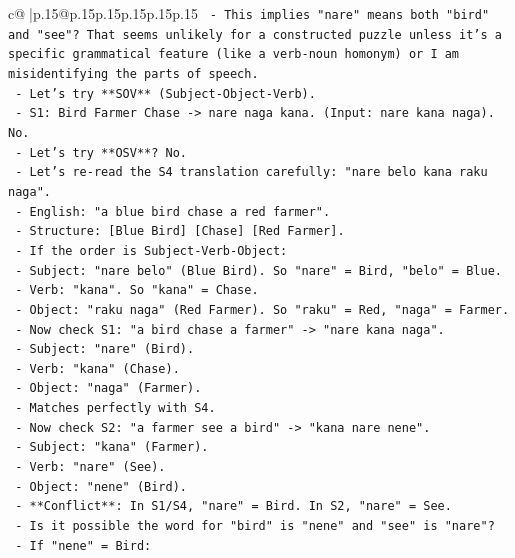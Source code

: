 \documentclass{article}
\begin{document}
{\begin{supertabular}{c@{$\;$}|p{.15\linewidth}@{}p{.15\linewidth}p{.15\linewidth}p{.15\linewidth}p{.15\linewidth}p{.15\linewidth}}
{{{\texttt{           {-} This implies "nare" means both "bird" and "see"? That seems unlikely for a constructed puzzle unless it's a specific grammatical feature (like a verb{-}noun homonym) or I am misidentifying the parts of speech.} \\
\texttt{       {-} Let's try **SOV** (Subject{-}Object{-}Verb).} \\
\texttt{         {-} S1: Bird Farmer Chase {-}> nare naga kana. (Input: nare kana naga). No.} \\
\texttt{       {-} Let's try **OSV**? No.} \\
\texttt{       {-} Let's re{-}read the S4 translation carefully: "nare belo kana raku naga".} \\
\texttt{         {-} English: "a blue bird chase a red farmer".} \\
\texttt{         {-} Structure: {[}Blue Bird{]} {[}Chase{]} {[}Red Farmer{]}.} \\
\texttt{         {-} If the order is Subject{-}Verb{-}Object:} \\
\texttt{           {-} Subject: "nare belo" (Blue Bird). So "nare" = Bird, "belo" = Blue.} \\
\texttt{           {-} Verb: "kana". So "kana" = Chase.} \\
\texttt{           {-} Object: "raku naga" (Red Farmer). So "raku" = Red, "naga" = Farmer.} \\
\texttt{         {-} Now check S1: "a bird chase a farmer" {-}> "nare kana naga".} \\
\texttt{           {-} Subject: "nare" (Bird).} \\
\texttt{           {-} Verb: "kana" (Chase).} \\
\texttt{           {-} Object: "naga" (Farmer).} \\
\texttt{           {-} Matches perfectly with S4.} \\
\texttt{         {-} Now check S2: "a farmer see a bird" {-}> "kana nare nene".} \\
\texttt{           {-} Subject: "kana" (Farmer).} \\
\texttt{           {-} Verb: "nare" (See).} \\
\texttt{           {-} Object: "nene" (Bird).} \\
\texttt{           {-} **Conflict**: In S1/S4, "nare" = Bird. In S2, "nare" = See.} \\
\texttt{           {-} Is it possible the word for "bird" is "nene" and "see" is "nare"?} \\
\texttt{             {-} If "nene" = Bird:} \\
}}}
\end{supertabular}}
\end{document}
